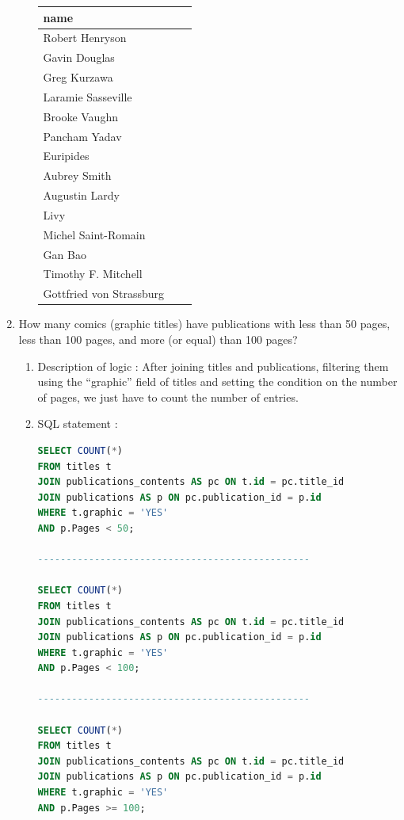\documentclass[doubleside, titlepage]{article}
\begin{document}
\begin{enumerate}
\begin{enumerate}
	\begin{tabular}{|l|c|r|}
  \hline
  name \\
  \hline
Robert Henryson\\
Gavin Douglas\\
Greg Kurzawa\\
Laramie Sasseville\\
Brooke Vaughn\\
Pancham Yadav\\
Euripides\\
Aubrey Smith\\
Augustin Lardy\\
Livy\\
Michel Saint-Romain\\
Gan Bao\\
Timothy F. Mitchell\\
Gottfried von Strassburg\\
  \hline
\end{tabular}

	\end{enumerate}

\item How many comics (graphic titles) have publications with less than 50 pages, less than 100 pages, and more (or equal) than 100 pages?

	\begin{enumerate}
	\item Description of logic : After joining titles and publications, filtering them using the “graphic” field of titles and setting the condition on the number of pages, we just have to count the number of entries.
	\item SQL statement :
		\begin{lstlisting}[language=SQL,showspaces=false,basicstyle=\ttfamily,numberstyle=\tiny,commentstyle=\color{gray}]
SELECT COUNT(*)
FROM titles t
JOIN publications_contents AS pc ON t.id = pc.title_id
JOIN publications AS p ON pc.publication_id = p.id
WHERE t.graphic = 'YES'
AND p.Pages < 50;

------------------------------------------------

SELECT COUNT(*)
FROM titles t
JOIN publications_contents AS pc ON t.id = pc.title_id
JOIN publications AS p ON pc.publication_id = p.id
WHERE t.graphic = 'YES'
AND p.Pages < 100;

------------------------------------------------

SELECT COUNT(*)
FROM titles t
JOIN publications_contents AS pc ON t.id = pc.title_id
JOIN publications AS p ON pc.publication_id = p.id
WHERE t.graphic = 'YES'
AND p.Pages >= 100;
		\end{lstlisting}


\end{enumerate}
\end{enumerate}
\end{document}
